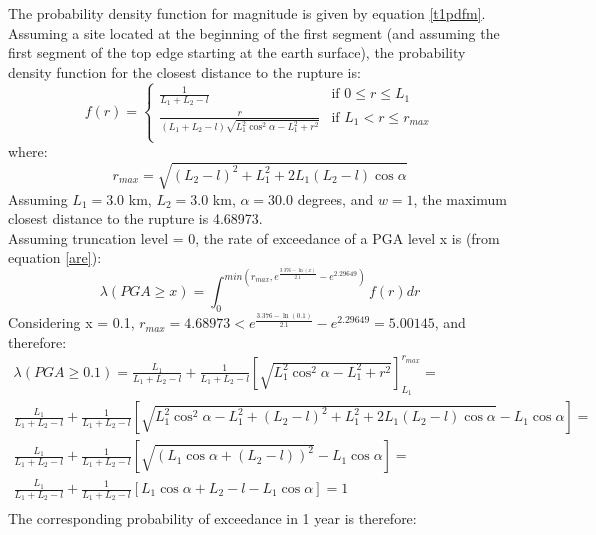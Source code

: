 The probability density function for magnitude is given by equation
\ref{t1pdfm}. Assuming a site located at the beginning of the first segment (and
assuming the first segment of the top edge starting at the earth surface), the
probability density function for the closest distance to the rupture is:
%
\begin{equation} f(r) = \begin{cases} \frac{1}{L_{1} + L_{2} - l}    &
\text{if } 0 \leq r \leq L_{1} \\ \frac{r}{(L_{1} + L_{2} -
l)\sqrt{L_{1}^{2}\cos^{2}\alpha - L_{1}^{2} + r^{2}}}                 &
    \text{if } L_{1} < r \leq r_{max} \\ \end{cases} \end{equation} where:
\begin{equation} 
    r_{max} = \sqrt{(L_{2} - l)^{2} + L_{1}^{2} + 2L_{1}(L_{2} - l)\cos\alpha} 
\end{equation} 
Assuming $L_{1}=3.0$ km, $L_{2}=3.0$ km,
$\alpha=30.0$ degrees, and $w=1$, the maximum closest distance to the rupture is
4.68973.\\ Assuming truncation level = 0, the rate of exceedance of a PGA level
x is (from equation \ref{are}): 
\begin{equation} \lambda(PGA \geq x) =
\int_{0}^{min(r_{max}, e^{\frac{3.376 - \ln(x)}{2.1}} - e^{2.29649})} f(r)dr
\end{equation} Considering x = 0.1, $r_{max} = 4.68973 < e^{\frac{3.376 -
\ln(0.1)}{2.1}}  - e^{2.29649} = 5.00145$, and therefore: 
\begin{eqnarray}
    \lambda(PGA \geq 0.1) = \frac{L_{1}}{L_{1}+L_{2}-l} +
    \frac{1}{L_{1}+L_{2}-l}\left[ \sqrt{L_{1}^{2}\cos^{2}\alpha-L_{1}^{2}+r^{2}}
    \right]_{L_{1}}^{r_{max}} =\nonumber \\ \frac{L_{1}}{L_{1}+L_{2}-l} +
    \frac{1}{L_{1}+L_{2}-l}\left[ \sqrt{L_{1}^{2}\cos^{2}\alpha - L_{1}^{2} +
    (L_{2}-l)^{2} + L_{1}^{2} + 2L_{1}(L_{2} - l)\cos\alpha} - L_{1}\cos\alpha
\right]=\nonumber \\ \frac{L_{1}}{L_{1}+L_{2}-l} + \frac{1}{L_{1}+L_{2}-l}\left[
\sqrt{(L_{1}\cos\alpha + (L_{2}-l))^{2}} - L_{1}\cos\alpha \right]=\nonumber \\
\frac{L_{1}}{L_{1}+L_{2}-l} + \frac{1}{L_{1}+L_{2}-l}\left[ L_{1}\cos\alpha
+L_{2} - l -L_{1}\cos\alpha \right] = 1 \nonumber \\
\end{eqnarray}
The corresponding probability of exceedance in 1 year is therefore:
